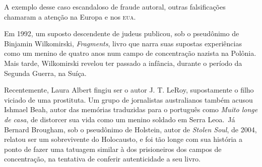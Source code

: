 A exemplo desse caso escandaloso de fraude autoral, outras falsificações
chamaram a atenção na Europa e nos \textsc{eua}.

Em 1992, um suposto descendente de judeus publicou, sob o pseudônimo de
Binjamin Wilkomirski, \emph{Fragments}, livro que narra suas supostas
experiências como um menino de quatro anos num campo de concentração
nazista na Polônia. Mais tarde, Wilkomirski revelou ter passado a
infância, durante o período da Segunda Guerra, na Suíça.

Recentemente, Laura Albert fingiu ser o autor J. T. LeRoy, supostamente
o filho viciado de uma prostituta. Um grupo de jornalistas australianos
também acusou Ishmael Beah, autor das memórias traduzidas para o
português como \emph{Muito longe de casa}, de distorcer sua vida como um
menino soldado em Serra Leoa.~Já Bernard Brougham, sob o pseudônimo de
Holstein, autor de \emph{Stolen Soul}, de 2004, relatou ser um
sobrevivente do Holocausto, e foi tão longe com sua história a ponto de
fazer uma tatuagem similar à dos prisioneiros dos campos de
concentração, na tentativa de conferir autenticidade a seu livro.

